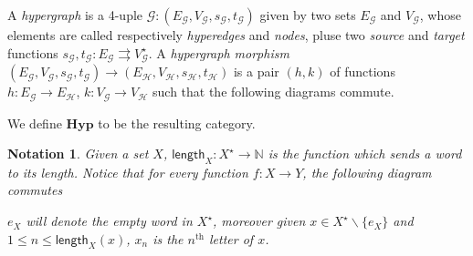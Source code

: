 \documentclass[a4paper,UKenglish,cleveref,pdftex,thm-restate,numberwithinsect]{lipics-v2021}
\newcommand{\cat}[1]{\ensuremath{\mathbf{#1}}}
\newcommand{\hyp}{\cat{Hyp}}
\newcommand{\lgt}[0]{\mathsf{length}}
\newtheorem*{notation}{Notation}
\begin{document}
\begin{definition}A \emph{hypergraph} is a 4-uple $\mathcal{G}:(E_\mathcal{G}, V_\mathcal{G}, s_\mathcal{G}, t_\mathcal{G})$ given by two sets $E_\mathcal{G}$ and $V_\mathcal{G}$, whose elements are called respectively \emph{hyperedges} and \emph{nodes}, pluse two \emph{source} and \emph{target}  functions $s_\mathcal{G}, t_\mathcal{G}:E_\mathcal{G}\rightrightarrows V_\mathcal{G}^\star$. A \emph{hypergraph morphism} $(E_\mathcal{G}, V_\mathcal{G}, s_\mathcal{G}, t_\mathcal{G})\to (E_\mathcal{H}, V_\mathcal{H}, s_\mathcal{H}, t_\mathcal{H})$ is a pair $(h,k)$ of functions $h:E_\mathcal{G}\to E_\mathcal{H}$, $k:V_\mathcal{G}\to V_\mathcal{H}$ such that the following diagrams commute.
	\begin{center}
	\end{center}	 
	We define $\hyp$ to be the resulting category.
\end{definition}

\begin{notation}Given a set $X$, $\lgt_X:X^{\star}\to \mathbb{N}$ is the function which sends a word to its length. Notice that for every function $f:X\to Y$, the following diagram commutes
	\begin{center}
	\end{center}
	$e_X$ will denote the empty word in $X^\star$, moreover given $x\in X^\star\smallsetminus\{e_X\}$ and $1\leq n\leq \lgt_X(x)$, $x_n$ is the $n^\mathrm{th}$ letter of $x$.
\end{notation}
\end{document}
